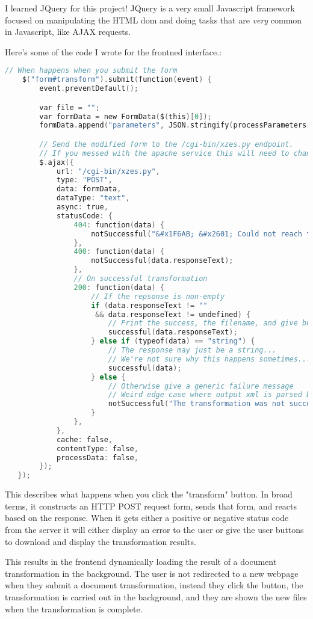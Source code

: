 I learned JQuery for this project!
JQuery is a very small Javascript framework focused on manipulating the HTML dom and doing tasks that are \textit{very} common in Javascript, like AJAX requests.

Here's some of the code I wrote for the frontned interface.:

\begin{lstlisting}[language=C]
    // When happens when you submit the form
    $("form#transform").submit(function(event) {
        event.preventDefault();

        var file = "";
        var formData = new FormData($(this)[0]);
        formData.append("parameters", JSON.stringify(processParameters()));

        // Send the modified form to the /cgi-bin/xzes.py endpoint.
        // If you messed with the apache service this will need to change.
        $.ajax({
            url: "/cgi-bin/xzes.py",
            type: "POST",
            data: formData,
            dataType: "text",
            async: true,
            statusCode: {
                404: function(data) {
                    notSuccessful("&#x1F6AB; &#x2601; Could not reach the transformer server...");
                },
                400: function(data) {
                    notSuccessful(data.responseText);
                },
                // On successful transformation
                200: function(data) {
                    // If the repsonse is non-empty
                    if (data.responseText != ""
                     && data.responseText != undefined) {
                        // Print the success, the filename, and give buttons to view/downlaod the file.
                        successful(data.responseText);
                    } else if (typeof(data) == "string") {
                        // The response may just be a string...
                        // We're not sure why this happens sometimes...
                        successful(data);
                    } else {
                        // Otherwise give a generic failure message
                        // Weird edge case where output xml is parsed by jquery as html
                        notSuccessful("The transformation was not successful.");
                    }
                },
            },
            cache: false,
            contentType: false,
            processData: false,
        });
   });
\end{lstlisting}

This describes what happens when you click the "transform" button.
In broad terms, it constructs an HTTP POST request form, sends that form, and reacts based on the response.
When it gets either a positive or negative status code from the server it will either display an error to the user or give the user buttons to download and display the transformation results.

This results in the frontend dynamically loading the result of a document transformation in the background.
The user is not redirected to a new webpage when they submit a document transformation, instead they click the button, the transformation is carried out in the background, and they are shown the new files when the transformation is complete.
